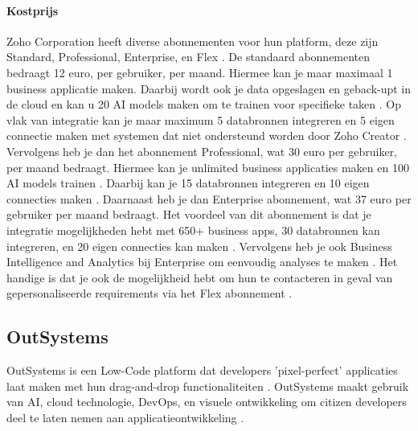 \paragraph{Kostprijs}
Zoho Corporation heeft diverse abonnementen voor hun platform, deze zijn Standard, Professional, Enterprise, en Flex \autocite{ZohoCorporation2024}.
De standaard abonnementen bedraagt 12 euro, per gebruiker, per maand. Hiermee kan je maar maximaal 1 business applicatie maken.
Daarbij wordt ook je data opgeslagen en geback-upt in de cloud en kan u 20 AI models maken om te trainen voor specifieke taken \autocite{ZohoCorporation2024}. Op vlak van integratie
kan je maar maximum 5 databronnen integreren en 5 eigen connectie maken met systemen dat niet ondersteund worden door Zoho Creator \autocite{ZohoCorporation2024}. Vervolgens heb je dan het
abonnement Professional, wat 30 euro per gebruiker, per maand bedraagt. Hiermee kan je unlimited business applicaties maken en 100 AI models trainen \autocite{ZohoCorporation2024}. 
Daarbij kan je 15 databronnen integreren en 10 eigen connecties maken \autocite{ZohoCorporation2024}. Daarnaast heb je dan Enterprise abonnement, wat 37 euro per gebruiker per maand bedraagt.
Het voordeel van dit abonnement is dat je integratie mogelijkheden hebt met 650+ business apps, 30 databronnen kan integreren, en 20 eigen connecties kan maken \autocite{ZohoCorporation2024}. Vervolgens heb je ook
Business Intelligence and Analytics bij Enterprise om eenvoudig analyses te maken \autocite{ZohoCorporation2024}. Het handige is dat je ook de mogelijkheid hebt om hun te contacteren in geval 
van gepersonaliseerde requirements via het Flex abonnement \autocite{ZohoCorporation2024}.

\subsection{OutSystems}%
\label{subsec:outsystems}
OutSystems is een Low-Code platform dat developers 'pixel-perfect' applicaties laat maken met hun drag-and-drop functionaliteiten \autocite{Ranosys2023} \autocite{Payne2023}.
OutSystems maakt gebruik van AI, cloud technologie, DevOps, en visuele ontwikkeling om citizen developers deel te laten nemen aan applicatieontwikkeling \autocite{Ranosys2023}.

